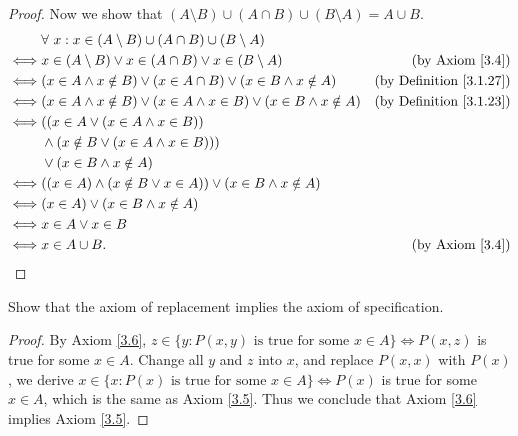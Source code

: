 \begin{proof}
Now we show that \((A \setminus B) \cup (A \cap B) \cup (B \setminus A) = A \cup B\).
\begin{align*}
& \forall\ x : x \in (A \setminus B) \cup (A \cap B) \cup (B \setminus A) \\
\iff & x \in (A \setminus B) \lor x \in (A \cap B) \lor x \in (B \setminus A) & \text{(by Axiom \ref{3.4})} \\
\iff & (x \in A \land x \notin B) \lor (x \in A \cap B) \lor (x \in B \land x \notin A) & \text{(by Definition \ref{3.1.27})} \\
\iff & (x \in A \land x \notin B) \lor (x \in A \land x \in B) \lor (x \in B \land x \notin A) & \text{(by Definition \ref{3.1.23})} \\
\iff & ((x \in A \lor (x \in A \land x \in B)) \\
& \land (x \notin B \lor (x \in A \land x \in B))) \\
& \lor (x \in B \land x \notin A) \\
\iff & ((x \in A) \land (x \notin B \lor x \in A)) \lor (x \in B \land x \notin A) \\
\iff & (x \in A) \lor (x \in B \land x \notin A) \\
\iff & x \in A \lor x \in B \\
\iff & x \in A \cup B. & \text{(by Axiom \ref{3.4})}
\end{align*}
\end{proof}

\begin{exercise}\label{ex 3.1.11}
Show that the axiom of replacement implies the axiom of specification.
\end{exercise}

\begin{proof}
By Axiom \ref{3.6}, \(z \in \{y : P(x, y) \text{ is true for some } x \in A\} \iff P(x, z)\) is true for some \(x \in A\).
Change all \(y\) and \(z\) into \(x\), and replace \(P(x, x)\) with \(P(x)\), we derive \(x \in \{x : P(x) \text{ is true for some } x \in A\} \iff P(x)\) is true for some \(x \in A\), which is the same as Axiom \ref{3.5}.
Thus we conclude that Axiom \ref{3.6} implies Axiom \ref{3.5}.
\end{proof}